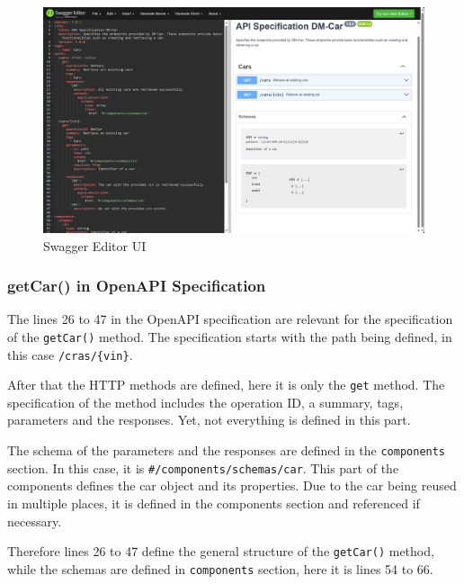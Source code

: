 \begin{figure}
    \centering
    \includegraphics[width=\textwidth]{figures/microservices/dmCar/ms_dmCar_swaggerEditorUI.png}
    \caption{Swagger Editor UI}
    \label{fig:ms_dmCar_swaggerEditorUI}
\end{figure}

\subsubsection*{getCar() in OpenAPI Specification}
The lines 26 to 47 in the OpenAPI specification are relevant for the specification of the \texttt{getCar()} method.
The specification starts with the path being defined, in this case \texttt{/cras/\{vin\}}.

After that the HTTP methods are defined, here it is only the \texttt{get} method.
The specification of the method includes the operation ID, a summary, tags, parameters and the responses.
Yet, not everything is defined in this part.

The schema of the parameters and the responses are defined in the \texttt{components} section.
In this case, it is \texttt{\#/components/schemas/car}.
This part of the components defines the car object and its properties.
Due to the car being reused in multiple places, it is defined in the components section and referenced if necessary.

Therefore lines 26 to 47 define the general structure of the \texttt{getCar()} method, while the schemas are defined in \texttt{components} section, here it is lines 54 to 66.